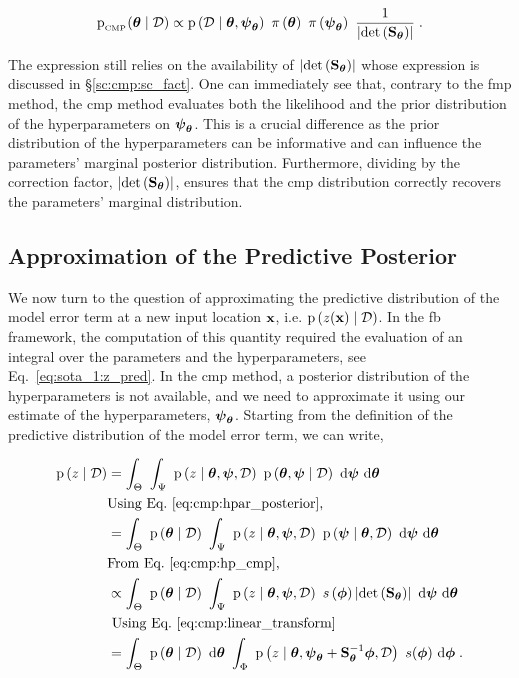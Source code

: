 \begin{equation}
    \mathrm{p}_{_\cmp} (\btheta \mid \data) \propto \likelihood{\data \mid  \btheta, \psimap} \ \prior{\btheta} \ \prior{\psimap} \ \dfrac{1}{\abs{\detf{\Stheta}}}\; .
    \label{eq:cmp:cmp}
\end{equation}

The expression still relies on the availability of $\abs{\detf{\Stheta}}$ whose expression is discussed in \S\ref{sc:cmp:sc_fact}. One can immediately see that, contrary to the \gls{fmp} method, the \gls{cmp} method evaluates both the likelihood and the prior distribution of the hyperparameters on $\psimap$. This is a crucial difference as the prior distribution of the hyperparameters can be informative and can influence the parameters' marginal posterior distribution. Furthermore, dividing by the correction factor, $\abs{\detf{\Stheta}}$, ensures that the \gls{cmp} distribution correctly recovers the parameters' marginal distribution.

\subsection{Approximation of the Predictive Posterior}
\label{sc:cmp:pred_post}

We now turn to the question of approximating the predictive distribution of the model error term at a new input location $\bx$, i.e. $\p{z(\bx) \mid \data}$. In the \gls{fb} framework, the computation of this quantity required the evaluation of an integral over the parameters and the hyperparameters, see Eq.~\eqref{eq:sota_1:z_pred}. In the \gls{cmp} method, a posterior distribution of the hyperparameters is not available, and we need to approximate it using our estimate of the hyperparameters, $\psimap$. Starting from the definition of the predictive distribution of the model error term, we can write,

\begin{equation}
    \left.
        \begin{aligned}
            \p{z \mid \data} &= \intt{\intpsi{\p{z \mid \btheta, \bpsi, \data} \ \p{\btheta, \bpsi \mid \data}}} \\
            & \text{Using Eq.~\eqref{eq:cmp:hpar_posterior}, } \\
            &= \intt{ \p{\btheta \mid \data} \ \intpsi{\p{z \mid \btheta, \bpsi, \data} \ \p{ \bpsi \mid \btheta, \data}}}\\
            & \text{From Eq.~\eqref{eq:cmp:hp_cmp},} \\
            &\propto \intt{ \p{\btheta \mid \data} \ \intpsi{\p{z \mid \btheta, \bpsi, \data} \ s\left(\bphi \right) \abs{\detf{\Stheta}}}} \\
            & \text{ Using Eq.~\eqref{eq:cmp:linear_transform}}\\
            & = \intt{ \p{\btheta \mid \data}} \ \intphi{\p{z \mid \btheta, \psimap + \Stheta^{-1} \bphi, \data} \ s(\bphi)} \;.
        \end{aligned}
    \right.
    \label{eq:cmp:pred_base}
\end{equation}

